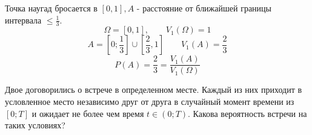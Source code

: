 \begin{exmp}
	Точка наугад бросается в $[0,1], A$ - расстояние от ближайшей границы интервала $\le \frac{1}{3}$.
	\[ \Omega = [0, 1], ~~~~~~~~~ V_1(\Omega) = 1 \]
	\[ A = \left[ 0; \frac{1}{3} \right] \cup \left[ \frac{2}{3}, 1 \right] ~~~~~~~~~ V_1 (A) = \frac{2}{3} \]
	\[ P(A) = \frac{2}{3} = \frac{V_1 (A)}{V_1 (\Omega)} \]
\end{exmp}

\begin{exmp}
	Двое договорились о встрече в определенном месте. Каждый из них приходит в условленное место независимо друг от друга в случайный момент времени из $[0; T]$ и ожидает не более чем время $t \in (0; T)$. Какова вероятность встречи на таких условиях?
\end{exmp}
\begin{figure}[H]
\end{figure}
